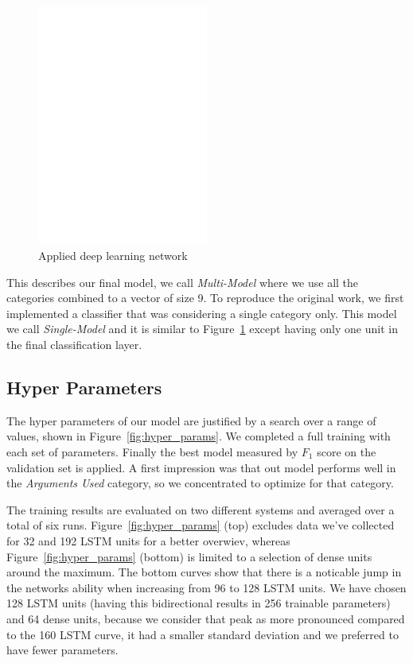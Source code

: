 \documentclass[11pt,a4paper]{article}
\begin{document}
\begin{figure}[h!]
	\centering
	\includegraphics[trim={1cm 19.5cm 5cm 3cm},clip,page=2, width=0.5\textwidth]{img/model}
	\caption{Applied deep learning network}
	\label{fig:model}
\end{figure}

This describes our final model, we call \textit{Multi-Model} where we use all the categories combined to a vector of size 9.
To reproduce the original work, we first implemented a classifier that was considering a single category only. 
This model we call \textit{Single-Model} and it is similar to Figure~\ref{fig:model} except having only one unit in the final classification layer.


\subsection{Hyper Parameters}

The hyper parameters of our model are justified by a search over a range of values, shown in Figure~\ref{fig:hyper_params}. 
We completed a full training with each set of parameters. Finally the best model measured by $F_1$ score on the validation set is applied. 
A first impression was that out model performs well in the \textit{Arguments Used} category, so we concentrated to optimize for that category.

The training results are evaluated on two different systems and averaged over a total of six runs. 
Figure~\ref{fig:hyper_params} (top) excludes data we've collected for 32 and 192 LSTM units for a better overwiev, whereas Figure~\ref{fig:hyper_params} (bottom) is limited to a selection of dense units around the maximum.
The bottom curves show that there is a noticable jump in the networks ability when increasing from 96 to 128 LSTM units.
We have chosen 128 LSTM units (having this bidirectional results in 256 trainable parameters) and 64 dense units, because we consider that peak as more pronounced compared to the 160 LSTM curve, it had a smaller standard deviation and we preferred to have fewer parameters.
\end{document}
